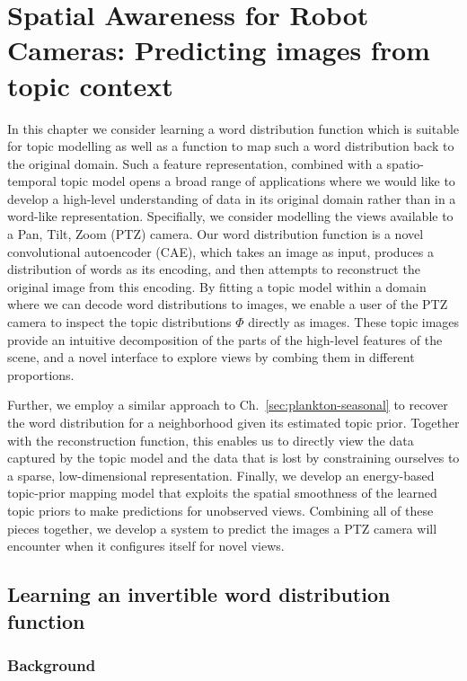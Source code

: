 
\chapter{Spatial Awareness for Robot Cameras: Predicting images from topic context} \label{ch:spatial-prediction}

In this chapter we consider learning a word distribution function which is suitable for topic modelling as well as a function to map such a word distribution back to the original domain. Such a feature representation, combined with a spatio-temporal topic model opens a broad range of applications where we would like to develop a high-level understanding of data in its original domain rather than in a word-like representation. Specifially, we consider modelling the views available to a Pan, Tilt, Zoom (PTZ) camera. Our word distribution function is a novel convolutional autoencoder (CAE), which takes an image as input, produces a distribution of words as its encoding, and then attempts to reconstruct the original image from this encoding. By fitting a topic model within a domain where we can decode word distributions to images, we enable a user of the PTZ camera to inspect the topic distributions $\Phi$ directly as images. These topic images provide an intuitive decomposition of the parts of the high-level features of the scene, and a novel interface to explore views by combing them in different proportions.

Further, we employ a similar approach to Ch.~\ref{sec:plankton-seasonal} to recover the word distribution for a neighborhood given its estimated topic prior. Together with the reconstruction function, this enables us to directly view the data captured by the topic model and the data that is lost by constraining ourselves to a sparse, low-dimensional representation. Finally, we develop an energy-based topic-prior mapping model that exploits the spatial smoothness of the learned topic priors to make predictions for unobserved views. Combining all of these pieces together, we develop a system to predict the images a PTZ camera will encounter when it configures itself for novel views.

\section{Learning an invertible word distribution function} \label{sec:learning-features}

\subsection{Background}

